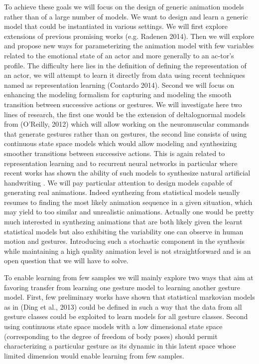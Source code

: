 To achieve these goals we will focus on the design of generic animation models rather than of a large number of models. We want to design and learn a generic model that could be instantiated in various settings. We will first explore extensions of previous promising works (e.g. Radenen 2014). Then we will explore and propose new ways for parameterizing the animation model with few variables related to the emotional state of an actor and more generally to an ac-tor's profile. The difficulty here lies in the definition of defining the representation of an actor, we will attempt to learn it directly from data using recent techniques named as representation learning (Contardo 2014). Second we will focus on enhancing the modeling formalism for capturing and modeling the smooth transition between successive actions or gestures. We will investigate here two lines of research, the first one would be the extension of deltalognormal models from (O'Reilly, 2012) which will allow working on the neuromuscular commands that generate gestures rather than on gestures, the second line consists of using continuous state space models which would allow modeling and synthesizing smoother transitions between successive actions. This is again related to representation learning and to recurrent neural networks in particular where recent works has shown the ability of such models to synthesize natural artificial handwriting \cite{Graves}. We will pay particular attention to design models capable of generating real animations. Indeed synthezing from statistical models usually resumes to finding the most likely animation sequence in a given situation, which may yield to too similar and unrealistic animations. Actually one would be pretty much interested in synthezing animations that are both likely given the learnt statistical models but also exhibiting the variability one can observe in human motion and gestures. Introducing such a stochastic component in the synthesis while maintaining a high quality animation level is not straightforward and is an open question that we will have to solve.

To enable learning from few samples we will mainly explore two ways that aim at favoring transfer from learning one gesture model to learning another gesture model. First, few preliminary works have shown that statistical markovian models as in (Ding et al., 2013) could be defined in such a way that the data from all gesture classes could be exploited to learn models for all gesture classes. Second using continuous state space models with a low dimensional state space (corresponding to the degree of freedom of body poses) should permit characterizing a particular gesture as its dynamic in this latent space whose limited dimension would enable learning from few samples.  

